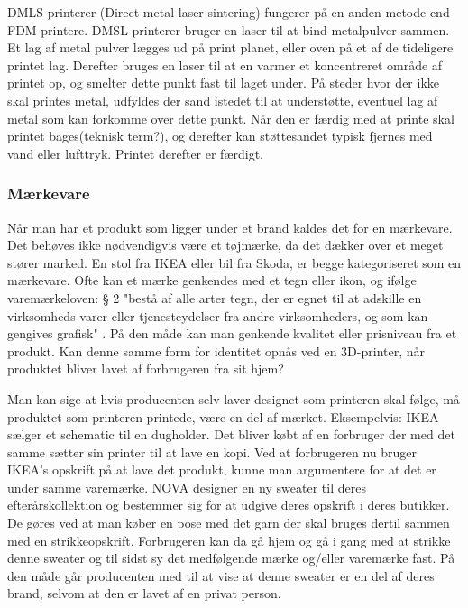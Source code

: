 DMLS-printerer (Direct metal laser sintering) fungerer på en anden metode end FDM-printere. DMSL-printerer bruger en laser til at bind metalpulver sammen. Et lag af metal pulver lægges ud på print planet, eller oven på et af de tideligere printet lag. Derefter bruges en laser til at en varmer et koncentreret område af printet op, og smelter dette punkt fast til laget under. På steder hvor der ikke skal printes metal, udfyldes der sand istedet til at understøtte, eventuel lag af metal som kan forkomme over dette punkt.
Når den er færdig med at printe skal printet bages(teknisk term?), og derefter kan støttesandet typisk fjernes med vand eller lufttryk. Printet derefter er færdigt.



\subsubsection{Mærkevare}

Når man har et produkt som ligger under et brand kaldes det for en mærkevare. Det behøves ikke nødvendigvis være et tøjmærke, da det dækker over et meget stører marked.  En stol fra IKEA eller bil fra Skoda, er begge kategoriseret som en mærkevare.  
Ofte kan et mærke genkendes med et tegn eller ikon, og ifølge varemærkeloven: § 2 "bestå af alle arter tegn, der er egnet til at adskille en virksomheds varer eller tjenesteydelser fra andre virksomheders, og som kan gengives grafisk" . På den måde kan man genkende kvalitet eller prisniveau fra et produkt.
Kan denne samme form for identitet opnås ved en 3D-printer, når produktet bliver lavet af forbrugeren fra sit hjem?

Man kan sige at hvis producenten selv laver designet som printeren skal følge, må produktet som printeren printede, være en del af mærket. Eksempelvis: IKEA sælger et schematic til en dugholder. Det bliver købt af en forbruger der med det samme sætter sin printer til at lave en kopi. Ved at forbrugeren nu bruger IKEA’s opskrift på at lave det produkt, kunne man argumentere for at det er under samme varemærke. NOVA designer en ny sweater til deres efterårskollektion og bestemmer sig for at udgive deres opskrift i deres butikker. De gøres ved at man køber en pose med det garn der skal bruges dertil sammen med en strikkeopskrift. Forbrugeren kan da gå hjem og gå i gang med at strikke denne sweater og til sidst sy det medfølgende mærke og/eller varemærke fast. På den måde går producenten med til at vise at denne sweater er en del af deres brand, selvom at den er lavet af en privat person. 

